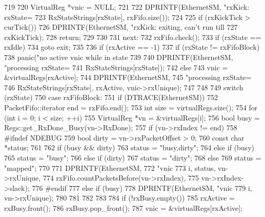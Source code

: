 \begin{DoxyCode}
719 {
720     VirtualReg *vnic = NULL;
721 
722     DPRINTF(EthernetSM, "rxKick: rxState=%
723             RxStateStrings[rxState], rxFifo.size());
724 
725     if (rxKickTick > curTick()) {
726         DPRINTF(EthernetSM, "rxKick: exiting, can't run till %
727                 rxKickTick);
728         return;
729     }
730 
731   next:
732     rxFifo.check();
733     if (rxState == rxIdle)
734         goto exit;
735 
736     if (rxActive == -1) {
737         if (rxState != rxFifoBlock)
738             panic("no active vnic while in state %
739 
740         DPRINTF(EthernetSM, "processing rxState=%
741                 RxStateStrings[rxState]);
742     } else {
743         vnic = &virtualRegs[rxActive];
744         DPRINTF(EthernetSM,
745                 "processing rxState=%
746                 RxStateStrings[rxState], rxActive, vnic->rxUnique);
747     }
748 
749     switch (rxState) {
750       case rxFifoBlock:
751         if (DTRACE(EthernetSM)) {
752             PacketFifo::iterator end = rxFifo.end();
753             int size = virtualRegs.size();
754             for (int i = 0; i < size; ++i) {
755                 VirtualReg *vn = &virtualRegs[i];
756                 bool busy = Regs::get_RxDone_Busy(vn->RxDone);
757                 if (vn->rxIndex != end) {
758 #ifndef NDEBUG
759                     bool dirty = vn->rxPacketOffset > 0;
760                     const char *status;
761 
762                     if (busy && dirty)
763                         status = "busy,dirty";
764                     else if (busy)
765                         status = "busy";
766                     else if (dirty)
767                         status = "dirty";
768                     else
769                         status = "mapped";
770 
771                     DPRINTF(EthernetSM,
772                             "vnic %
773                             i, status, vn->rxUnique,
774                             rxFifo.countPacketsBefore(vn->rxIndex),
775                             vn->rxIndex->slack);
776 #endif
777                 } else if (busy) {
778                     DPRINTF(EthernetSM, "vnic %
779                             i, vn->rxUnique);
780                 }
781             }
782         }
783 
784         if (!rxBusy.empty()) {
785             rxActive = rxBusy.front();
786             rxBusy.pop_front();
787             vnic = &virtualRegs[rxActive];
}}}
\end{DoxyCode}
